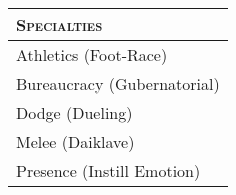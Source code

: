 \begin{figure}[b!]
    \noindent%
    \begin{minipage}[t]{\dimexpr0.60\linewidth - 10pt}%
        \PrintArmorList
    \end{minipage}%
    \hspace{\fill}%
    \begin{minipage}[t]{\dimexpr0.40\linewidth - 10pt}%
        \begin{xltabular}{\textwidth}{X}
            \bfseries\scshape Specialties \\
            \hline%
            \endhead%
            Athletics (Foot-Race) \\
            Bureaucracy (Gubernatorial) \\
            Dodge (Dueling) \\
            Melee (Daiklave) \\
            Presence (Instill Emotion) \\
        \end{xltabular}
    \end{minipage}

    \vspace{0.5\baselineskip}

    \PrintPools

    \vspace{-\baselineskip}

    \begin{minipage}[t]{\dimexpr0.60\linewidth - 10pt}%
        \PrintHealthLevels%
    \end{minipage}%
    \hspace{\fill}%
    \begin{minipage}[t]{\dimexpr0.40\linewidth - 10pt}%
        \PrintMiscStats
    \end{minipage}
\end{figure}


\PrintAttributeList

\vspace{0pt plus 12pt minus 12pt}

\PrintAbilityList

\vspace{0pt plus 12pt minus 12pt}

\PrintWeaponList


\cleardoublepage
{}
\PrintCharmList{}

\twocolumn


